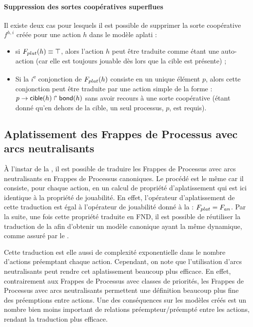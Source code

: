 \paragraph{Suppression des sortes coopératives superflues}
Il existe deux cas pour lesquels il est possible de supprimer la sorte coopérative $f^{h,i}$
créée pour une action $h$ dans le modèle aplati :
\begin{itemize}
  \item si $F_{plat}(h) \equiv \top$, alors l'action $h$ peut être traduite comme étant
    une auto-action (car elle est toujours jouable dès lors que la cible est présente) ;
  \item Si la $i$\textsuperscript{e} conjonction de $F_{plat}(h)$ consiste
    en un unique élément $p$, alors cette conjonction peut être traduite par une action simple
    de la forme : $p\rightarrow\mathsf{cible}(h)\Rsh\mathsf{bond}(h)$ sans avoir recours à une sorte coopérative
    (étant donné qu'en dehors de la cible, un seul processus, $p$, est requis).
\end{itemize}



\subsection{Aplatissement des Frappes de Processus avec arcs neutralisants}

À l'instar de la , il est possible de traduire les Frappes de Processus
avec arcs neutralisants en Frappes de Processus canoniques.
Le procédé est le même car il consiste, pour chaque action,
en un calcul de propriété d'aplatissement
qui est ici identique à la propriété de jouabilité.
En effet, l'opérateur d'aplatissement de cette traduction est égal à l'opérateur de jouabilité 
donné à la  : $F_{plat} = F_{an}$.
Par la suite, une fois cette propriété traduite en FND, il est possible de réutiliser
la traduction de la  afin d'obtenir un modèle canonique
ayant la même dynamique, comme assuré par le .

Cette traduction est elle aussi de complexité exponentielle dans le nombre d'actions
préemptant chaque action.
Cependant, on note que l'utilisation d'arcs neutralisants peut rendre cet aplatissement
beaucoup plus efficace.
En effet, contrairement aux Frappes de Processus avec classes de priorités,
les Frappes de Processus avec arcs neutralisants permettent une définition beaucoup plus fine
des préemptions entre actions.
Une des conséquences sur les modèles créés est un nombre bien moins important de relations
préempteur/préempté entre les actions, rendant la traduction plus efficace.



